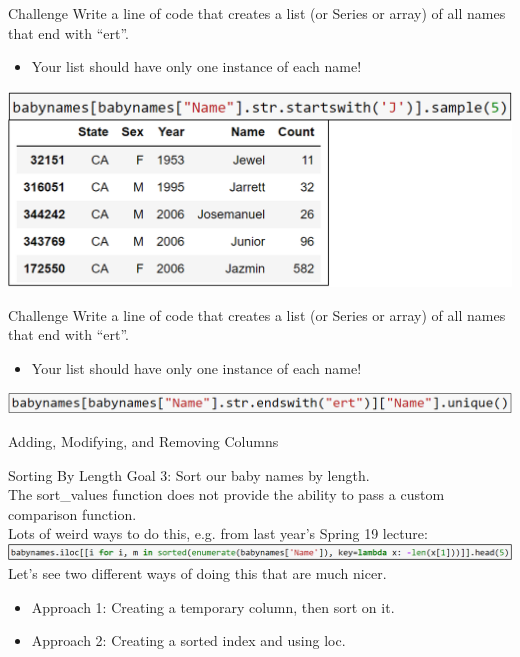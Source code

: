 \documentclass[aspectratio=169]{../latex_main/tntbeamer}  %
\begin{document}
	
	
	\begin{frame}[c]{Challenge}
	    Write a line of code that creates a list (or Series or array) of all names that end with “ert”.
	    \begin{itemize}
	        \item Your list should have only one instance of each name!
	    \end{itemize}
	    \includegraphics[scale=.44]{Bild9}\\
	\end{frame}
	
	
	\begin{frame}[c]{Challenge}
	    Write a line of code that creates a list (or Series or array) of all names that end with “ert”.
	    \begin{itemize}
	        \item Your list should have only one instance of each name!
	    \end{itemize}
	    \includegraphics[scale=.74]{Bild10}\\
	\end{frame}
	
	\begin{frame}{Adding, Modifying, and Removing Columns}
	    
	\end{frame}
	
	
	\begin{frame}[c]{Sorting By Length}
	   Goal 3: Sort our baby names by length. \\
	   \bigskip
	   The sort\_values function does not provide the ability to pass a custom comparison function.\\
	   \bigskip
	   Lots of weird ways to do this, e.g. from last year’s Spring 19 lecture:\\
	   \includegraphics[scale=.65]{Bild11}\\
	    Let’s see two different ways of doing this that are much nicer.
	    \begin{itemize}
	        \item Approach 1: Creating a temporary column, then sort on it.
	        \item Approach 2: Creating a sorted index and using loc.
	    \end{itemize}
	    
	\end{frame}
	
\end{document}
